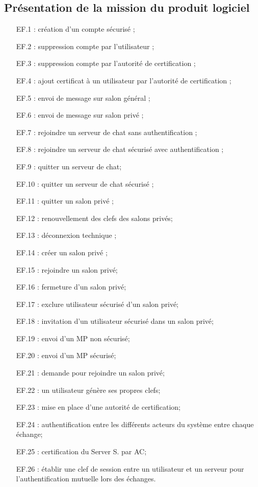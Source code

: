 \documentclass[a4paper,11pt,french]{article}
\begin{document}
\subsection{Présentation de la mission du produit logiciel}
\begin{itemize}
\item [EF.1] : création d'un compte sécurisé ;
\item [EF.2] : suppression compte par l'utilisateur ;
\item [EF.3] : suppression compte par l'autorité de certification ;
\item [EF.4] : ajout certificat à un utilisateur par l'autorité de certification ;
\item [EF.5] : envoi de message sur salon général ;
\item [EF.6] : envoi de message sur salon privé ;
\item [EF.7] : rejoindre un serveur de chat sans authentification ;
\item [EF.8] : rejoindre un serveur de chat sécurisé avec authentification ;
\item [EF.9] : quitter un serveur de chat;
\item [EF.10] : quitter un serveur de chat sécurisé ;
\item [EF.11] : quitter un salon privé ;
\item [EF.12] : renouvellement des clefs des salons privés;
\item [EF.13] : déconnexion technique ;
\item [EF.14] : créer un salon privé ;
\item [EF.15] : rejoindre un salon privé;
\item [EF.16] : fermeture d'un salon privé;
\item [EF.17] : exclure utilisateur sécurisé d'un salon privé;
\item [EF.18] : invitation d'un utilisateur sécurisé dans un salon privé;
\item [EF.19] : envoi d'un MP non sécurisé;
\item [EF.20] : envoi d'un MP sécurisé;
\item [EF.21] : demande pour rejoindre un salon privé;
\item [EF.22] : un utilisateur génère ses propres clefs;
\item [EF.23] : mise en place d'une autorité de certification;
\item [EF.24] : authentification entre les différents acteurs du système entre chaque échange;
\item [EF.25] : certification du Server S. par AC;
\item [EF.26] : établir une clef de session entre un utilisateur et un serveur pour l'authentification mutuelle lors des échanges.
\end{itemize}
\end{document}
